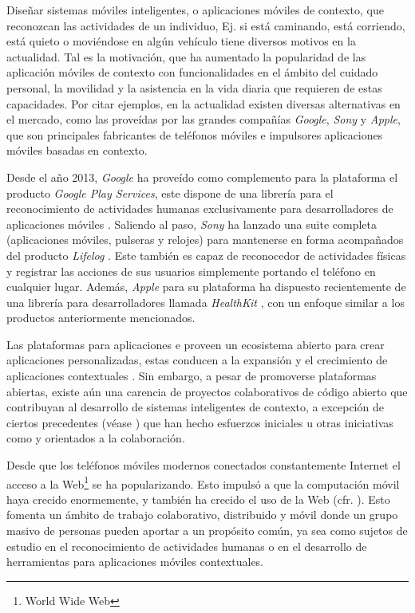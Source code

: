 Diseñar sistemas móviles inteligentes, o aplicaciones móviles de contexto,
que reconozcan las actividades de un individuo, Ej. si está caminando,
está corriendo, está quieto o moviéndose en algún vehículo tiene diversos
motivos en la actualidad\cite{CampuzanoLopez2015,Google2013l}. Tal
es la motivación, que ha aumentado la popularidad de las aplicación
móviles de contexto con funcionalidades en el ámbito del cuidado personal,
la movilidad y la asistencia en la vida diaria que requieren de estas
capacidades. Por citar ejemplos, en la actualidad existen diversas
alternativas en el mercado, como las proveídas por las grandes compañías
\emph{Google}, \emph{Sony} y \emph{Apple}, que son principales fabricantes
de teléfonos móviles e impulsores aplicaciones móviles basadas en
contexto.

Desde el año 2013, \emph{Google} ha proveído como complemento para
la plataforma \emph{ }\cite{Google2005a} el producto
\emph{Google Play Services}, este dispone de una librería para el
reconocimiento de actividades humanas exclusivamente para desarrolladores
de aplicaciones móviles \cite{Google2013l}. Saliendo al paso, \emph{Sony}
ha lanzado una suite completa (aplicaciones móviles, pulseras y relojes)
para mantenerse en forma acompañados del producto \emph{Lifelog} \cite{Sony2016l}.
Este también es capaz de reconocedor de actividades físicas y registrar
las acciones de sus usuarios simplemente portando el teléfono en cualquier
lugar. Además, \emph{Apple} para su plataforma\emph{ }
\cite{Apple2007i} ha dispuesto recientemente de una librería para
desarrolladores llamada \emph{HealthKit} \cite{Apple2016h}, con un
enfoque similar a los productos anteriormente mencionados. 

Las plataformas para aplicaciones \emph{} e \emph{}
proveen un ecosistema abierto para crear aplicaciones personalizadas,
estas conducen a la expansión y el crecimiento de aplicaciones contextuales
\cite{Tanenbaum2010}. Sin embargo, a pesar de promoverse plataformas
abiertas, existe aún una carencia de proyectos colaborativos de código
abierto que contribuyan al desarrollo de sistemas inteligentes de
contexto, a excepción de ciertos precedentes (véase \cite{Kwapisz2011,LaraLabrador2013})
que han hecho esfuerzos iniciales u otras iniciativas como \cite{FUNF2016}
y \cite{SensingKit2016} orientados a la colaboración.

Desde que los teléfonos móviles modernos conectados constantemente
Internet el acceso a la Web\footnote{World Wide Web} se ha popularizando.
Esto impulsó a que la computación móvil haya crecido enormemente,
y también ha crecido el uso de la Web (cfr. \cite{NYTimes2008iph}).
Esto fomenta un ámbito de trabajo colaborativo, distribuido y móvil
donde un grupo masivo de personas pueden aportar a un propósito común,
ya sea como sujetos de estudio en el reconocimiento de actividades
humanas o en el desarrollo de herramientas para aplicaciones móviles
contextuales.

